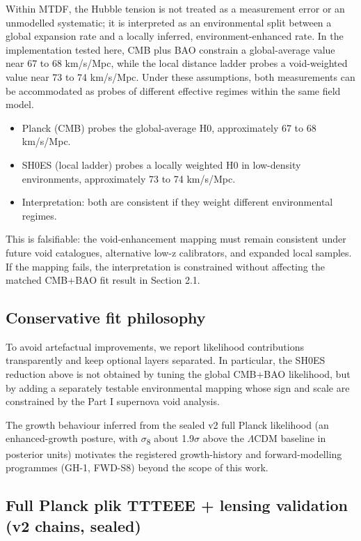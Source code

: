 \documentclass[11pt,a4paper]{article}
\begin{document}
Within MTDF, the Hubble tension is not treated as a measurement error or an unmodelled systematic; it is interpreted as an environmental split between a global expansion rate and a locally inferred, environment-enhanced rate. In the implementation tested here, CMB plus BAO constrain a global-average value near 67 to 68 km/\allowbreak{}s/\allowbreak{}Mpc, while the local distance ladder probes a void-weighted value near 73 to 74 km/\allowbreak{}s/\allowbreak{}Mpc. Under these assumptions, both measurements can be accommodated as probes of different effective regimes within the same field model.

\begin{itemize}
  \item Planck (CMB) probes the global-average H0, approximately 67 to 68 km/\allowbreak{}s/\allowbreak{}Mpc.
  \item SH0ES (local ladder) probes a locally weighted H0 in low-density environments, approximately 73 to 74 km/\allowbreak{}s/\allowbreak{}Mpc.
  \item Interpretation: both are consistent if they weight different environmental regimes.
\end{itemize}

This is falsifiable: the void-enhancement mapping must remain consistent under future void catalogues, alternative low-z calibrators, and expanded local samples. If the mapping fails, the interpretation is constrained without affecting the matched CMB+BAO fit result in Section 2.1.

\subsection{Conservative fit philosophy}
To avoid artefactual improvements, we report likelihood contributions transparently and keep optional layers separated. In particular, the SH0ES reduction above is not obtained by tuning the global CMB+BAO likelihood, but by adding a separately testable environmental mapping whose sign and scale are constrained by the Part I supernova void analysis.

The growth behaviour inferred from the sealed v2 full Planck likelihood (an enhanced-growth posture, with $\sigma$\textsubscript{8} about 1.9$\sigma$ above the $\Lambda$CDM baseline in posterior units) motivates the registered growth-history and forward-modelling programmes (GH-1, FWD-S8) beyond the scope of this work.

\subsection{Full Planck plik TTTEEE + lensing validation (v2 chains, sealed)}
\label{sec:phase5}
\end{document}
